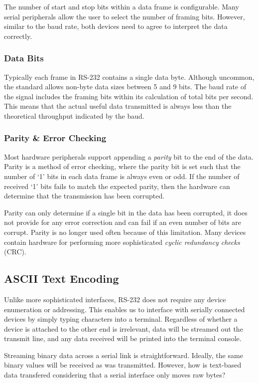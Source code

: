 \documentclass[openany,11pt,fleqn]{book} %
\begin{document}
The number of start and stop bits within a data frame is configurable. Many serial peripherals allow the user to select the number of framing bits. However, similar to the baud rate, both devices need to agree to interpret the data correctly. 
 

\subsubsection{Data Bits} 
Typically each frame in RS-232 contains a single data byte. Although uncommon, the standard allows non-byte data sizes between 5 and 9 bits. The baud rate of the signal includes the framing bits within its calculation of total bits per second. This means that the actual useful data transmitted is always less than the theoretical throughput indicated by the baud. 

\subsubsection{Parity \& Error Checking}
Most hardware peripherals support appending a \textit{parity} bit to the end of the data. Parity is a method of error checking, where the parity bit is set such that the number of `1' bits in each data frame is always even or odd. If the number of received `1' bits fails to match the expected parity, then the hardware can determine that the transmission has been corrupted. 

Parity can only determine if a single bit in the data has been corrupted, it does not provide for any error correction and can fail if an even number of bits are corrupt. Parity is no longer used often because of this limitation. Many devices contain hardware for performing more sophisticated \textit{cyclic redundancy checks} (CRC).  


\subsection{ASCII Text Encoding}

Unlike more sophisticated interfaces, RS-232 does not require any device enumeration or addressing. This enables us to interface with serially connected devices by simply typing characters into a terminal. Regardless of whether a device is attached to the other end is irrelevant, data will be streamed out the transmit line, and any data received will be printed into the terminal console.  

Streaming binary data across a serial link is straightforward. Ideally, the same binary values will be received as was transmitted. However, how is text-based data transfered considering that a serial interface only moves raw bytes? 
\end{document}
